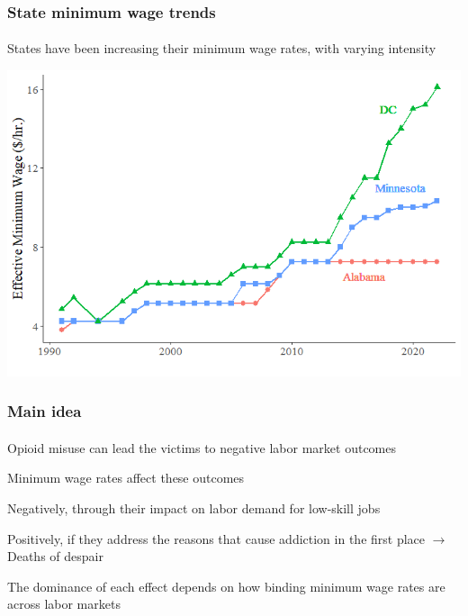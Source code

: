 \begin{frame}

    \label{Minimum Wage}
    \frametitle{State minimum wage trends} %
    \framesubtitle{}  %
    \rmfamily %
    
    \begin{wideitemize} 
        \item States have been increasing their \textcolor{fblu}{minimum wage rates}, with varying intensity
    \end{wideitemize}

    \begin{center}
        \includegraphics[scale=0.5]{min_wage_plot_simp.png}
    \end{center}
    
    \hyperlink{min_wage_plot_allstates}{}
    
\end{frame}


\begin{frame}

    \frametitle{Main idea} %
    \framesubtitle{}  %
    \rmfamily %
    
    \begin{wideitemize}
        \item Opioid misuse can lead the victims to negative labor market outcomes
        \item Minimum wage rates affect these outcomes 
        \vspace{9pt}
        \begin{wideitemize}
            \item[\textcolor{fblu}{\textbullet}] Negatively, through their impact on \textcolor{fblu}{labor demand for low-skill jobs} 
            \item[\textcolor{fblu}{\textbullet}] Positively, if they address the reasons that cause \textcolor{fblu}{addiction} in the first place \(\to\) \textcolor{fblu}{Deaths of despair}
        \end{wideitemize}
        \item The dominance of each effect depends on how \textcolor{fblu}{binding} minimum wage rates are across labor markets
    \end{wideitemize}

\end{frame}


